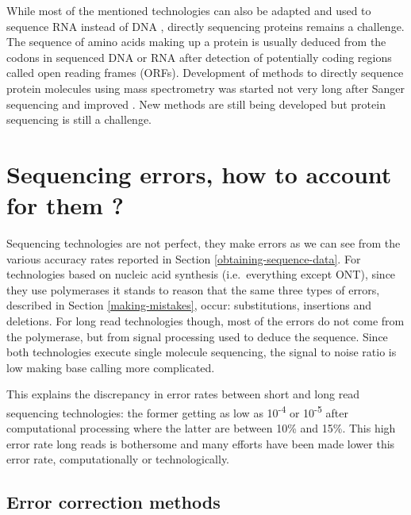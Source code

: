 \documentclass[
  11pt,
  twoside,
  BCOR=10mm,
  listof=totoc]{scrbook}
\begin{document}
While most of the mentioned technologies can also be adapted and used to sequence RNA instead of DNA \autocite{hongRNASequencingNew2020,ozsolakRNASequencingAdvances2011}, directly sequencing proteins remains a challenge. The sequence of amino acids making up a protein is usually deduced from the codons in sequenced DNA or RNA after detection of potentially coding regions called open reading frames (ORFs). Development of methods to directly sequence protein molecules using mass spectrometry was started not very long after Sanger sequencing \autocite{huntProteinSequencingTandem1986} and improved \autocite{smithProteinSequencingProtocols2002}. New methods are still being developed \autocite{restrepo-perezPavingWaySinglemolecule2018} but protein sequencing is still a challenge.

\hypertarget{sequencing-errors-how-to-account-for-them}{%
\section{Sequencing errors, how to account for them ?}\label{sequencing-errors-how-to-account-for-them}}

Sequencing technologies are not perfect, they make errors as we can see from the various accuracy rates reported in Section \ref{obtaining-sequence-data}. For technologies based on nucleic acid synthesis (i.e.~everything except ONT), since they use polymerases it stands to reason that the same three types of errors, described in Section \ref{making-mistakes}, occur: substitutions, insertions and deletions. For long read technologies though, most of the errors do not come from the polymerase, but from signal processing used to deduce the sequence. Since both technologies execute single molecule sequencing, the signal to noise ratio is low \autocite{weirather2017,wangNanoporeSequencingTechnology2021} making base calling more complicated.

This explains the discrepancy in error rates between short and long read sequencing technologies: the former getting as low as 10\textsuperscript{-4} or 10\textsuperscript{-5} after computational processing \autocite{maAnalysisErrorProfiles2019} where the latter are between 10\% and 15\%. This high error rate long reads is bothersome and many efforts have been made lower this error rate, computationally or technologically.

\hypertarget{error-correction-methods}{%
\subsection{Error correction methods}\label{error-correction-methods}}
\end{document}
